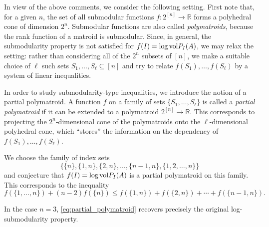 \documentclass[11pt]{amsart}
\newcommand{\R}{\mathbb R}
\def\vol{{\rm vol}}
\theoremstyle{definition}
\theoremstyle{remark}
\begin{document}
In view of the above comments, we consider the following setting. First note that, for a given $n$, the set of all submodular functions $f : 2^{[n]} \to \R$ forms a polyhedral cone of dimension $2^n$. Submodular functions are also called {\it polymatroids}, because the rank function of a matroid is submodular. Since, in general, the submodularity property is not satisfied for $f(I) = \log \vol P_I(A)$, we may relax the setting: rather than considering all of the $2^n$ subsets of $[n]$, we make a suitable choice of $\ell$ such sets $S_1,\ldots, S_\ell \subseteq [n]$ and try to relate $f(S_1) ,\ldots, f(S_\ell)$ by a system of linear inequalities. 

In order to study submodularity-type inequalities, we introduce the notion of a partial polymatroid. A function $f$ on a family of sets $\{S_1,\ldots,S_\ell\}$ is called a {\it partial polymatroid} if it can be extended to a polymatroid $2^{[n]} \to \R$. This corresponds to projecting the $2^n$-dimensional cone of the polymatroids onto the $\ell$-dimensional polyhedral cone, which ``stores'' the information on the dependency of $f(S_1),\ldots, f(S_\ell)$. 

We choose the family of index sets 
    \[
    \{\{n\},\{1,n\},\{2,n\},\ldots, \{n-1,n\},\{1,2,\ldots,n\}\}
    \]
    and conjecture that  $f(I) = \log \vol P_I(A)$ is a partial polymatroid on this family. This corresponds to the inequality 
    \begin{equation}\label{eq:partial_polymatroid}
    f(\{1,\dots,n\})+(n-2)f(\{n\})
    \le f(\{1,n\})+f(\{2,n\})+\cdots+f(\{n-1,n\}).
    \end{equation}

    
    
In the case $n=3$, \eqref{eq:partial_polymatroid} recovers precisely the original log-submodularity property.

\end{document}
